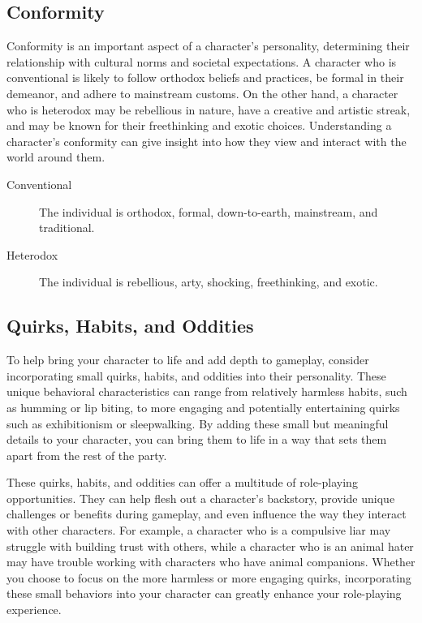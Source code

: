 \documentclass[12pt]{book}  %
\begin{document}
\subsection{\textbf{Conformity}}

Conformity is an important aspect of a character's personality, determining their relationship with cultural norms and societal expectations. A character who is conventional is likely to follow orthodox beliefs and practices, be formal in their demeanor, and adhere to mainstream customs. On the other hand, a character who is heterodox may be rebellious in nature, have a creative and artistic streak, and may be known for their freethinking and exotic choices. Understanding a character's conformity can give insight into how they view and interact with the world around them.

\begin{description}
    \item[Conventional] The individual is orthodox, formal, down-to-earth, mainstream, and traditional.
    \item[Heterodox] The individual is rebellious, arty, shocking, freethinking, and exotic.
\end{description}

\subsection{\textbf{Quirks, Habits, and Oddities}}

To help bring your character to life and add depth to gameplay, consider incorporating small quirks, habits, and oddities into their personality. These unique behavioral characteristics can range from relatively harmless habits, such as humming or lip biting, to more engaging and potentially entertaining quirks such as exhibitionism or sleepwalking. By adding these small but meaningful details to your character, you can bring them to life in a way that sets them apart from the rest of the party.

These quirks, habits, and oddities can offer a multitude of role-playing opportunities. They can help flesh out a character's backstory, provide unique challenges or benefits during gameplay, and even influence the way they interact with other characters. For example, a character who is a compulsive liar may struggle with building trust with others, while a character who is an animal hater may have trouble working with characters who have animal companions. Whether you choose to focus on the more harmless or more engaging quirks, incorporating these small behaviors into your character can greatly enhance your role-playing experience.
\end{document}

